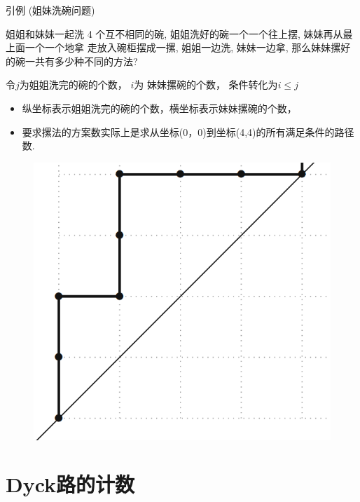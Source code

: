 \documentclass[punct]{beamer}
\newtheorem{defi}[thm]{定义}
\begin{document}
\begin{frame}
    \begin{block}{引例 (姐妹洗碗问题)}

        姐姐和妹妹一起洗 4 个互不相同的碗, 姐姐洗好的碗一个一个往上摆, 妹妹再从最上面一个一个地拿 走放入碗柜摆成一摞, 姐姐一边洗, 妹妹一边拿, 那么妹妹摞好的碗一共有多少种不同的方法?
    \end{block}
     令$j$为姐姐洗完的碗的个数， $i$为 妹妹摞碗的个数， 条件转化为$i\le j$



\begin{minipage}{0.55\linewidth}



    \begin{itemize}
        \item 纵坐标表示姐姐洗完的碗的个数，横坐标表示妹妹摞碗的个数，
            \item 要求摞法的方案数实际上是求从坐标(0，0)到坐标(4,4)的所有满足条件的路径数.
    \end{itemize}

\end{minipage}
 \begin{minipage}{0.4\linewidth}
        \begin{figure}[h]
            \centering
            \includegraphics[width=0.6\linewidth]{path.png}
        \end{figure}
 \end{minipage}



\end{frame}


\section{Dyck路的计数}
\end{document}
